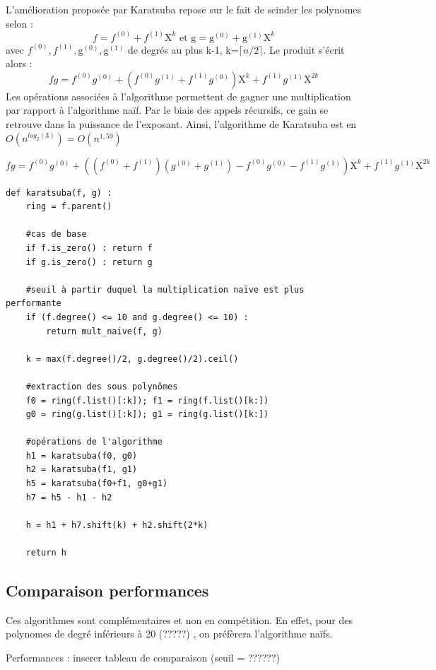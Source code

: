 \documentclass[a4paper]{article}
\begin{document}
L'amélioration proposée par Karatsuba repose sur le fait de scinder les polynomes selon :
\[
f=f^{(0)}+f^{(1)}\mathrm{X}^k\text{ et }\mathrm{g} = \mathrm{g}^{(0)}+\mathrm{g}^{(1)}\mathrm{X}^k
\]
avec $f^{(0)}, f^{(1)}, \mathrm{g}^{(0)}, \mathrm{g}^{(1)}$ de degrés au plus k-1, k=$\lceil n/2 \rceil$. Le produit s'écrit alors :
\[
fg = f^{(0)}g^{(0)}+(f^{(0)}g^{(1)}+f^{(1)}g^{(0)})\mathrm{X}^k+f^{(1)}g^{(1)}\mathrm{X}^{2k} 
\]
Les opérations associées à l'algorithme permettent de gagner une multiplication par rapport à l'algorithme naïf. Par le biais des appels récursifs, ce gain se retrouve dans la puissance de l'exposant.
Ainsi, l'algorithme de Karatsuba est en $O(n^{log_2(3)}) = O(n^{1,59})$

\[
  fg = f^{(0)}g^{(0)}
  +\left((f^{(0)}+f^{(1)}) (g^{(0)} + g^{(1)}) - f^{(0)}g^{(0)} - f^{(1)}g^{(1)}\right)\mathrm{X}^k+
  f^{(1)}g^{(1)}\mathrm{X}^{2k} 
\]


\begin{lstlisting}[title={karatsuba}]
def karatsuba(f, g) :
    ring = f.parent()

    #cas de base
    if f.is_zero() : return f
    if g.is_zero() : return g
    
    #seuil à partir duquel la multiplication naïve est plus performante
    if (f.degree() <= 10 and g.degree() <= 10) : 
        return mult_naive(f, g)

    k = max(f.degree()/2, g.degree()/2).ceil()

    #extraction des sous polynômes
    f0 = ring(f.list()[:k]); f1 = ring(f.list()[k:])
    g0 = ring(g.list()[:k]); g1 = ring(g.list()[k:])

    #opérations de l'algorithme
    h1 = karatsuba(f0, g0)
    h2 = karatsuba(f1, g1)
    h5 = karatsuba(f0+f1, g0+g1)
    h7 = h5 - h1 - h2

    h = h1 + h7.shift(k) + h2.shift(2*k)

    return h
\end{lstlisting}


\subsection{Comparaison performances}

\cite{aecf} Ces algorithmes sont complémentaires et non en compétition. En effet, pour des polynomes de degré inférieurs à 20 (?????) , on préfèrera l'algorithme naïfs.

Performances : inserer tableau de comparaison  (seuil = ??????)
\end{document}
